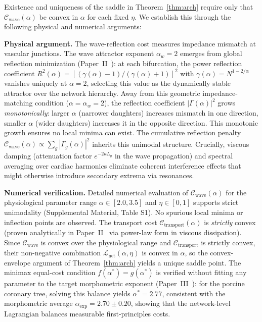 \begin{remark}
\label{rem:quasiconvex}
Existence and uniqueness of the saddle in Theorem~\ref{thm:arch} require
only that $\mathcal{C}_{\mathrm{wave}}(\alpha)$ be convex in $\alpha$ for each
fixed $\eta$. We establish this through the following physical and numerical
arguments:

\textbf{Physical argument.} The wave-reflection cost measures impedance mismatch
at vascular junctions. The wave attractor exponent $\alpha_w = 2$ emerges from
global reflection minimization (Paper~II~\cite{paperII}): at each bifurcation,
the power reflection coefficient $R^2(\alpha) =
[(\gamma(\alpha)-1)/(\gamma(\alpha)+1)]^2$ with $\gamma(\alpha) =
N^{1-2/\alpha}$ vanishes uniquely at $\alpha = 2$, selecting this value as the
dynamically stable attractor over the network hierarchy. Away from this
geometric impedance-matching condition ($\alpha = \alpha_w = 2$), the reflection
coefficient $|\Gamma(\alpha)|^2$ grows \emph{monotonically}: larger $\alpha$
(narrower daughters) increases mismatch in one direction, smaller $\alpha$
(wider daughters) increases it in the opposite direction. This monotonic growth
ensures no local minima can exist. The cumulative reflection penalty
$\mathcal{C}_{\mathrm{wave}}(\alpha) \propto \sum_g |\Gamma_g(\alpha)|^2$
inherits this unimodal structure. Crucially, viscous damping (attenuation factor
$e^{-2\kappa L_g}$ in the wave propagation) and spectral averaging over cardiac
harmonics eliminate coherent interference effects that might otherwise introduce
secondary extrema via resonances.

\textbf{Numerical verification.} Detailed numerical evaluation of
$\mathcal{C}_{\mathrm{wave}}(\alpha)$ for the physiological parameter range
$\alpha \in [2.0, 3.5]$ and $\eta \in [0,1]$ supports strict unimodality
(Supplemental Material, Table S1). No spurious local minima or inflection points
are observed. The transport cost $\mathcal{C}_{\mathrm{transport}}(\alpha)$ is
\emph{strictly} convex (proven analytically in Paper~II~\cite{paperII} via
power-law form in viscous dissipation). Since $\mathcal{C}_{\mathrm{wave}}$
is convex over the physiological range and $\mathcal{C}_{\mathrm{transport}}$ is
strictly convex, their non-negative combination
$\mathcal{L}_{\mathrm{net}}(\alpha,\eta)$ is convex in $\alpha$, so the
convex-envelope argument of Theorem~\ref{thm:arch} yields a unique saddle
point. The minimax equal-cost condition $f(\alpha^*) = g(\alpha^*)$ is verified
without fitting any parameter to the target morphometric exponent
(Paper~III~\cite{paperIII}): for the porcine coronary tree, solving this balance
yields $\alpha^* = 2.77$, consistent with the morphometric average
$\alpha_{\exp} = 2.70 \pm 0.20$, showing that the network-level Lagrangian
balances measurable first-principles costs.
\end{remark}

